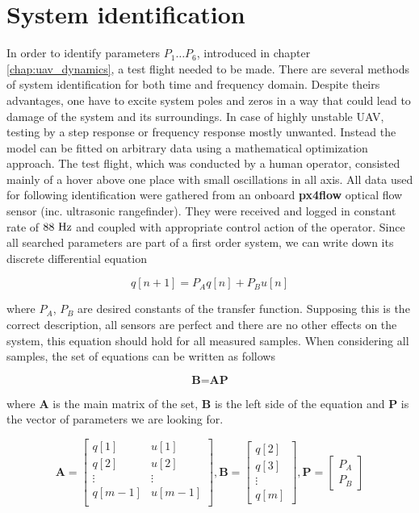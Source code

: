 \section{System identification}
\label{cap:system_identification}

In order to identify parameters $P_1 \hdots P_6$, introduced in chapter \ref{chap:uav_dynamics}, a test flight needed to be made. There are several methods of system identification for both time and frequency domain. Despite theirs advantages, one have to excite system poles and zeros in a way that could lead to damage of the system and its surroundings. In case of highly unstable UAV, testing by a step response or frequency response mostly unwanted. Instead the model can be fitted on arbitrary data using a mathematical optimization approach. The test flight, which was conducted by a human operator, consisted mainly of a hover above one place with small oscillations in all axis. All data used for following identification were gathered from an onboard \textbf{px4flow} optical flow sensor (inc. ultrasonic rangefinder). They were received and logged in constant rate of $88~\mathrm{Hz}$ and coupled with appropriate control action of the operator. Since all searched parameters are part of a first order system, we can write down its discrete differential equation

\begin{equation}
q[n+1] = P_Aq[n] + P_Bu[n]
\end{equation}

where $P_A$, $P_B$ are desired constants of the transfer function. Supposing this is the correct description, all sensors are perfect and there are no other effects on the system, this equation should hold for all measured samples. When considering all samples, the set of equations can be written as follows

\begin{equation}
\textbf{B} = \textbf{A}\textbf{P}
\label{eq:bap}
\end{equation}

where \textbf{A} is the main matrix of the set, \textbf{B} is the left side of the equation and \textbf{P} is the vector of parameters we are looking for.

\begin{equation}
\textbf{A} = \begin{bmatrix}
q[1] & u[1] \\
q[2] & u[2] \\
\vdots & \vdots \\
q[m-1] & u[m-1] \\
\end{bmatrix},
\textbf{B} = \begin{bmatrix}
q[2] \\
q[3] \\
\vdots\\
q[m]
\end{bmatrix},
\textbf{P} = \begin{bmatrix}
P_A \\
P_B
\end{bmatrix}
\end{equation}

